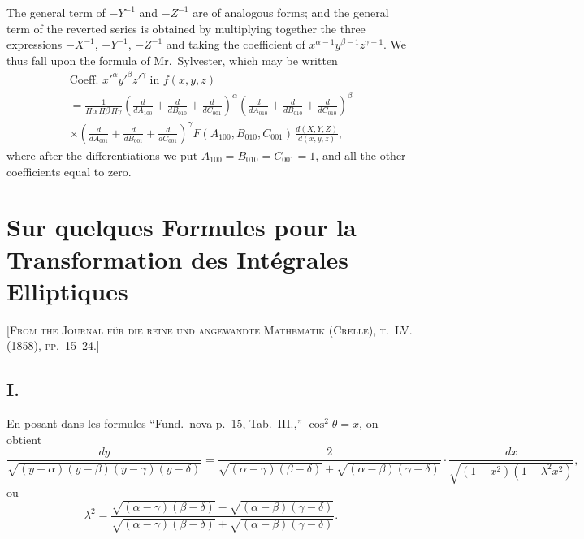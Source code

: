 \documentclass[11pt,a4paper]{article}
\begin{document}
The general term of $-Y^{-1}$ and $-Z^{-1}$ are of analogous forms; and the general term of the reverted series is obtained by multiplying together the three expressions $-X^{-1}$, $-Y^{-1}$, $-Z^{-1}$ and taking the coefficient of $x^{\alpha-1}y^{\beta-1}z^{\gamma-1}$. We thus fall upon the formula of Mr.~Sylvester, which may be written
\begin{multline*}
\text{Coeff. } x'^\alpha y'^\beta z'^\gamma \text{ in } f(x,y,z) \\
= \frac{1}{\Pi\alpha\,\Pi\beta\,\Pi\gamma}
\left(
\frac{d}{dA_{100}} + \frac{d}{dB_{010}} + \frac{d}{dC_{001}}
\right)^\alpha
\left(
\frac{d}{dA_{010}} + \frac{d}{dB_{010}} + \frac{d}{dC_{010}}
\right)^\beta \\
\times\left(
\frac{d}{dA_{001}} + \frac{d}{dB_{001}} + \frac{d}{dC_{001}}
\right)^\gamma
F(A_{100},B_{010},C_{001})\,\frac{d(X,Y,Z)}{d(x,y,z)},
\end{multline*}
where after the differentiations we put $A_{100}=B_{010}=C_{001}=1$, and all the other coefficients equal to zero.

\newpage



\section{Sur quelques Formules pour la Transformation des Intégrales Elliptiques}

\textsc{[From the Journal für die reine und angewandte Mathematik (Crelle), t.~LV. (1858), pp.~15--24.]}
\label{paper:235}

\setcounter{page}{61}

\subsection*{I.}

En posant dans les formules ``Fund.\ nova p.~15, Tab.~III.,'' $\cos^2\theta = x$, on obtient
\[
\frac{dy}{\sqrt{(y-\alpha)(y-\beta)(y-\gamma)(y-\delta)}}
= \frac{2}{\sqrt{(\alpha-\gamma)(\beta-\delta)} + \sqrt{(\alpha-\beta)(\gamma-\delta)}} \cdot \frac{dx}{\sqrt{(1-x^2)(1-\lambda^2x^2)}},
\]
ou
\[
\lambda^2 = \frac{\sqrt{(\alpha-\gamma)(\beta-\delta)} - \sqrt{(\alpha-\beta)(\gamma-\delta)}}{\sqrt{(\alpha-\gamma)(\beta-\delta)} + \sqrt{(\alpha-\beta)(\gamma-\delta)}}.
\]
\end{document}

